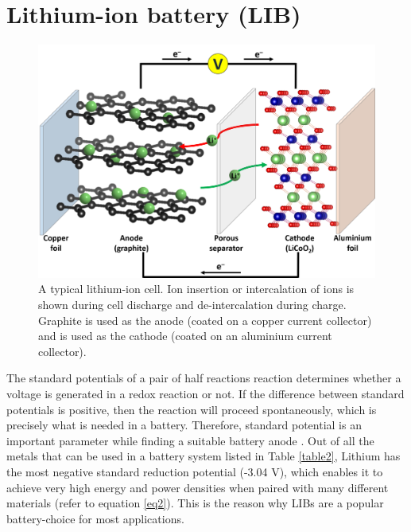 \section{Lithium-ion battery (LIB)}
\begin{figure}[tbh!]
\centering
\includegraphics[width=\textwidth]{Figures/chap1fig/LIB}
\caption{A typical lithium-ion cell. Ion insertion or intercalation of  ions is shown during cell discharge and de-intercalation during charge. Graphite is used as the anode (coated on a copper current collector) and  is used as the cathode (coated on an aluminium current collector).}
\label{Figures/chap1fig:LIB}
\end{figure}

The standard potentials of a pair of half reactions reaction determines whether a voltage is generated in a redox reaction or not. If the difference between standard potentials is positive, then the reaction will proceed spontaneously, which is precisely what is needed in a battery. Therefore, standard potential is an important parameter while finding a suitable battery anode \cite{liu_understanding_2016}. Out of all the metals that can be used in a battery system listed in Table \ref{table2}, Lithium has the most negative standard reduction potential (-3.04 V), which enables it to achieve very high energy and power densities when paired with many different materials (refer to equation \ref{eq2}). This is the reason why LIBs are a popular battery-choice for most applications.

